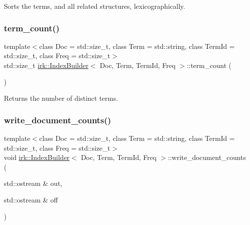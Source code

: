 Sorts the terms, and all related structures, lexicographically. 

\mbox{\label{classirk_1_1IndexBuilder_a3da7972f7fc0a34635ff82d6f9bc111d}} 
\subsubsection{\texorpdfstring{term\+\_\+count()}{term\_count()}}
{\footnotesize\ttfamily template$<$class Doc  = std\+::size\+\_\+t, class Term  = std\+::string, class Term\+Id  = std\+::size\+\_\+t, class Freq  = std\+::size\+\_\+t$>$ \\
std\+::size\+\_\+t \mbox{\hyperlink{classirk_1_1IndexBuilder}{irk\+::\+Index\+Builder}}$<$ Doc, Term, Term\+Id, Freq $>$\+::term\+\_\+count (\begin{DoxyParamCaption}{ }\end{DoxyParamCaption})\hspace{0.3cm}{\ttfamily [inline]}}



Returns the number of distinct terms. 

\mbox{\label{classirk_1_1IndexBuilder_ac1a50c03b4caafd42b214c8118fe661c}} 
\subsubsection{\texorpdfstring{write\+\_\+document\+\_\+counts()}{write\_document\_counts()}}
{\footnotesize\ttfamily template$<$class Doc  = std\+::size\+\_\+t, class Term  = std\+::string, class Term\+Id  = std\+::size\+\_\+t, class Freq  = std\+::size\+\_\+t$>$ \\
void \mbox{\hyperlink{classirk_1_1IndexBuilder}{irk\+::\+Index\+Builder}}$<$ Doc, Term, Term\+Id, Freq $>$\+::write\+\_\+document\+\_\+counts (\begin{DoxyParamCaption}\item[{std\+::ostream \&}]{out,  }\item[{std\+::ostream \&}]{off }\end{DoxyParamCaption})\hspace{0.3cm}{\ttfamily [inline]}}



